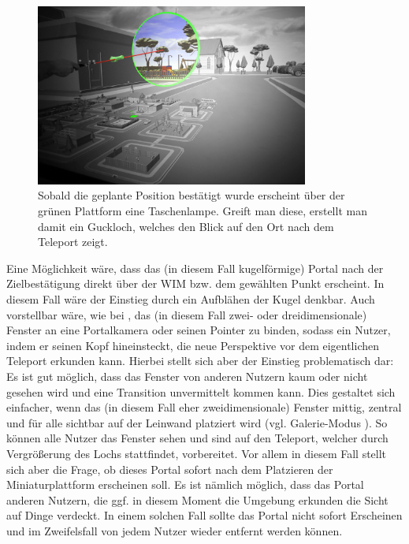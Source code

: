 \begin{figure}[h!]
  \centering
  \includegraphics[width=0.8\textwidth]{images/peephole.jpg}
  \caption{Sobald die geplante Position bestätigt wurde erscheint über der grünen Plattform eine Taschenlampe. Greift man diese, erstellt man damit ein Guckloch, welches den Blick auf den Ort nach dem Teleport zeigt.}
  \label{fig:todo}
\end{figure}

Eine Möglichkeit wäre, dass das (in diesem Fall kugelförmige) Portal nach der Zielbestätigung direkt über der WIM bzw. dem gewählten Punkt erscheint. In diesem Fall wäre der Einstieg durch ein Aufblähen der Kugel denkbar.
Auch vorstellbar wäre, wie bei \cite{Kunert2014Photoportals}, das (in diesem Fall zwei- oder dreidimensionale) Fenster an eine Portalkamera oder seinen Pointer zu binden, sodass ein Nutzer, indem er seinen Kopf hineinsteckt, die neue Perspektive vor dem eigentlichen Teleport erkunden kann. Hierbei stellt sich aber der Einstieg problematisch dar: Es ist gut möglich, dass das Fenster von anderen Nutzern kaum oder nicht gesehen wird und eine Transition unvermittelt kommen kann.
Dies gestaltet sich einfacher, wenn das (in diesem Fall eher zweidimensionale) Fenster mittig, zentral und für alle sichtbar auf der Leinwand platziert wird (vgl. Galerie-Modus \cite{Kunert2014Photoportals}). So können  alle Nutzer das Fenster sehen und sind auf den Teleport, welcher durch Vergrößerung des Lochs stattfindet, vorbereitet.
Vor allem in diesem Fall stellt sich aber die Frage, ob dieses Portal sofort nach dem Platzieren der Miniaturplattform erscheinen soll. Es ist nämlich möglich, dass das Portal anderen Nutzern, die ggf. in diesem Moment die Umgebung erkunden die Sicht auf Dinge verdeckt. In einem solchen Fall sollte das Portal nicht sofort Erscheinen und im Zweifelsfall von jedem Nutzer wieder entfernt werden können.

